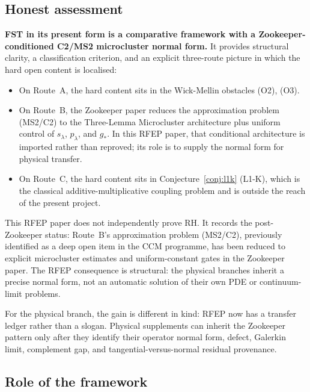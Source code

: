 \documentclass[11pt,a4paper]{article}
\theoremstyle{plain}
\theoremstyle{definition}
\begin{document}
\subsection{Honest assessment}

\textbf{FST in its present form is a comparative framework with a
Zookeeper-conditioned C2/MS2 microcluster normal form.}  It provides structural clarity, a
classification criterion, and an explicit three-route picture in
which the hard open content is localised:

\begin{itemize}[leftmargin=*]
\item On Route~A, the hard content sits in the Wick-Mellin obstacles
  (O2), (O3).
\item On Route~B, the Zookeeper paper reduces the approximation
  problem (MS2/C2) to the Three-Lemma Microcluster architecture plus
  uniform control of $s_\lambda$, $p_\lambda$, and $g_*$.  In this
  RFEP paper, that conditional architecture is imported rather than
  reproved; its role is to supply the normal form for physical
  transfer.
\item On Route~C, the hard content sits in Conjecture~\ref{conj:l1k}
  (L1-K), which is the classical additive-multiplicative coupling
  problem and is outside the reach of the present project.
\end{itemize}

This RFEP paper does not independently prove RH.  It records the
post-Zookeeper status: Route~B's approximation problem (MS2/C2),
previously identified as a deep open item in the CCM programme, has
been reduced to explicit microcluster estimates and uniform-constant
gates in the Zookeeper paper.  The RFEP consequence is structural:
the physical branches inherit a precise normal form, not an automatic
solution of their own PDE or continuum-limit problems.

For the physical branch, the gain is different in kind: RFEP now has
a transfer ledger rather than a slogan.  Physical supplements can
inherit the Zookeeper pattern only after they identify their operator
normal form, defect, Galerkin limit, complement gap, and
tangential-versus-normal residual provenance.

\subsection{Role of the framework}
\end{document}
